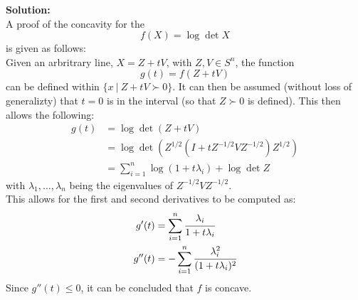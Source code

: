 \documentclass[letter]{article}
\begin{document}
\noindent
\textbf{Solution:}\\
A proof of the concavity for the $$f(X) = \log \det X$$ is given as follows:\\
Given an arbritrary line, $X = Z + t V$, with $Z, V \in S^n$, the function $$g(t) = f(Z + t V)$$ can be defined within $\{x \ | \ Z + t V \succ 0\}$. It can then be assumed (without loss of generalizty) that $t = 0$ is in the interval (so that $Z \succ 0$ is defined). This then allows the following:
\begin{align}
	g(t) &= \log \det(Z+tV)\\
		 &= \log \det(Z^{1/2} (I + t Z^{-1/2}V Z^{-1/2})Z^{1/2})\\
		 &= \sum_{i=1}^n \log(1 + t \lambda_i) + \log \det Z
\end{align}
with $\lambda_1, \dots, \lambda_n$ being the eigenvalues of $Z^{-1/2} V Z^{-1/2}$.\\
This allows for the first and second derivatives to be computed as:
\begin{align}
	g'(t) &= \sum_{i=1}^n \cfrac{\lambda_i}{1 + t \lambda_i}\\
	g''(t) &= -\sum_{i=1}^n \cfrac{\lambda_i^2}{(1 + t \lambda_i)^2}
\end{align}
Since $g''(t) \leq 0$, it can be concluded that $f$ is concave.\\
\end{document}
